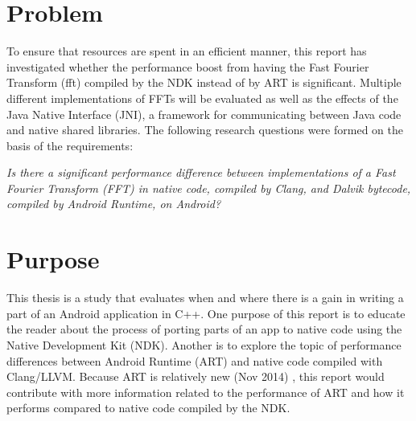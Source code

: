 
\section{Problem}
To ensure that resources are spent in an efficient manner, this report has investigated whether the performance boost from having the Fast Fourier Transform (\gls{fft}) compiled by the NDK instead of by ART is significant. Multiple different implementations of FFTs will be evaluated as well as the effects of the Java Native Interface (JNI), a framework for communicating between Java code and native shared libraries. The following research questions were formed on the basis of the requirements:



\begin{center}
    \textit{Is there a significant performance difference between implementations of a Fast Fourier Transform (FFT) in native code, compiled by Clang, and Dalvik bytecode, compiled by Android Runtime, on Android?}
\end{center}


\section{Purpose}
This thesis is a study that evaluates when and where there is a gain in writing a part of an Android application in C++. One purpose of this report is to educate the reader about the process of porting parts of an app to native code using the Native Development Kit (NDK). Another is to explore the topic of performance differences between Android Runtime (ART) and native code compiled with Clang/LLVM. Because ART is relatively new (Nov 2014) \cite{android:dalvik:release}, this report would contribute with more information related to the performance of ART and how it performs compared to native code compiled by the NDK.

